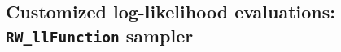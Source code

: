 \documentclass[12pt,oneside]{book}\usepackage[]{graphicx}\usepackage[]{color}
\def\cd#1{\texttt{#1}}
\begin{document}






\subsection{Customized log-likelihood evaluations: \cd{RW\_llFunction} sampler}
 
\end{document}
